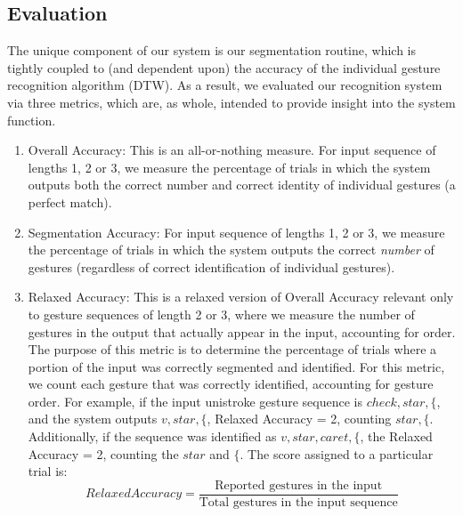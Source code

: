 \documentclass[twoside]{article}
\begin{document}
\begin{multicols}{2}
\section{Evaluation}


The unique component of our system is our segmentation routine, which is
tightly coupled to (and dependent upon) the accuracy of the individual gesture
recognition algorithm (DTW). As a result, we evaluated our recognition system via three
metrics, which are, as whole, intended to provide insight into the system function.

\begin{enumerate}
\item Overall Accuracy: This is an all-or-nothing measure. For input sequence of
lengths 1, 2 or 3, we measure the percentage of trials in which the system
outputs both the correct number and correct identity of individual gestures (a perfect match).

\item
Segmentation Accuracy: For input sequence of lengths 1, 2 or 3, we measure the
percentage of trials in which the system outputs the correct \emph{number} of
gestures (regardless of correct identification of individual gestures).

\item Relaxed Accuracy: This is a relaxed version of Overall Accuracy relevant
only to gesture sequences of length 2 or 3, where we measure the number of
gestures in the output that actually appear in the input, accounting for order.
The purpose of this metric is to determine the percentage of trials where a
portion of the input was correctly segmented and identified.
For this metric, we count each gesture that was correctly identified, accounting
for gesture order. For example, if the input unistroke gesture sequence is
$check, star, \{$, and the system outputs $v, star, \{$, Relaxed Accuracy = 2, counting $star, \{$. Additionally, if
the sequence was identified as $v, star, caret, \{$, the Relaxed Accuracy = 2,
counting the $star$ and $\{$. The score assigned to a particular trial is:
\[
		Relaxed Accuracy = \frac{\text{Reported gestures in the input}}{\text{Total gestures in the input sequence}}
	\]
\end{enumerate}


\end{multicols}
\end{document}
